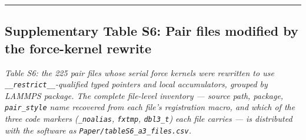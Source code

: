 \documentclass[
  11pt,
]{article}
\begin{document}
\begin{center}\rule{0.5\linewidth}{0.5pt}\end{center}

\subsection{Supplementary Table S6: Pair files modified by the
force-kernel
rewrite}\label{supplementary-table-s6-pair-files-modified-by-the-force-kernel-rewrite}

\emph{Table S6: the 225 pair files whose serial force kernels were
rewritten to use \texttt{\_\_restrict\_\_}-qualified typed pointers and
local accumulators, grouped by LAMMPS package. The complete file-level
inventory --- source path, package, \texttt{pair\_style} name recovered
from each file's registration macro, and which of the three code markers
(\texttt{\_noalias}, \texttt{fxtmp}, \texttt{dbl3\_t}) each file carries
--- is distributed with the software as
\texttt{Paper/tableS6\_a3\_files.csv}.}
\end{document}
